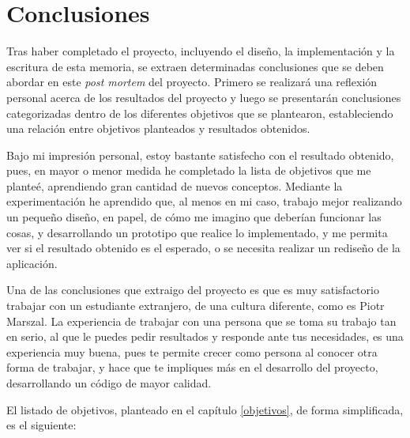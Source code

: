\chapter{Conclusiones}
\label{conclusiones}

Tras haber completado el proyecto, incluyendo el diseño, la implementación y la escritura de esta memoria, se extraen determinadas conclusiones que se deben abordar en este \textit{post mortem} del proyecto. Primero se realizará una reflexión personal acerca de los resultados del proyecto y luego se presentarán conclusiones categorizadas dentro de los diferentes objetivos que se plantearon, estableciendo una relación entre objetivos planteados y resultados obtenidos.

Bajo mi impresión personal, estoy bastante satisfecho con el resultado obtenido, pues, en mayor o menor medida he completado la lista de objetivos que me planteé, aprendiendo gran cantidad de nuevos conceptos. Mediante la experimentación he aprendido que, al menos en mi caso, trabajo mejor realizando un pequeño diseño, en papel, de cómo me imagino que deberían funcionar las cosas, y desarrollando un prototipo que realice lo implementado, y me permita ver si el resultado obtenido es el esperado, o se necesita realizar un rediseño de la aplicación.

Una de las conclusiones que extraigo del proyecto es que es muy satisfactorio trabajar con un estudiante extranjero, de una cultura diferente, como es Piotr Marszal. La experiencia de trabajar con una persona que se toma su trabajo tan en serio, al que le puedes pedir resultados y responde ante tus necesidades, es una experiencia muy buena, pues te permite crecer como persona al conocer otra forma de trabajar, y hace que te impliques más en el desarrollo del proyecto, desarrollando un código de mayor calidad.

El listado de objetivos, planteado en el capítulo \ref{objetivos}, de forma simplificada, es el siguiente:


